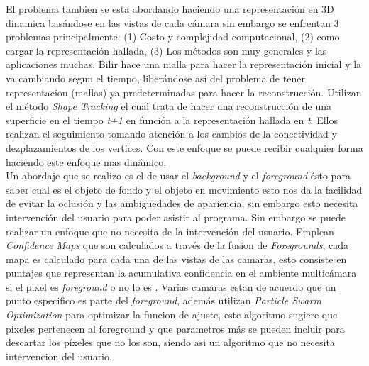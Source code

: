 \documentclass[conference]{IEEEtran}
\begin{document}
El problema tambien se esta abordando haciendo una representaci\'on en 3D dinamica bas\'andose en las vistas de cada c\'amara sin embargo se enfrentan 3 problemas principalmente: (1) Costo y complejidad computacional, (2) como cargar la representaci\'on hallada, (3) Los m\'etodos son muy generales y las aplicaciones muchas. Bilir hace una malla para hacer la representaci\'on inicial y la va cambiando segun el tiempo, liber\'andose as\'i del problema de tener representacion (mallas) ya predeterminadas para hacer la reconstrucci\'on. Utilizan el m\'etodo \textit{Shape Tracking} el cual trata de hacer una reconstrucci\'on de una superficie en el tiempo \emph{t+1} en funci\'on a la representaci\'on hallada en \emph{t}. Ellos realizan el seguimiento tomando atenci\'on a los cambios de la conectividad y dezplazamientos   de los vertices. Con este enfoque se puede recibir cualquier forma haciendo este enfoque mas din\'amico.\cite{Bilir_art}\\
Un abordaje que se realizo es el de usar el \textit{background} y el \textit{foreground} \'esto para saber cual es el objeto de fondo y el objeto en movimiento esto nos da la facilidad de evitar la oclusi\'on y las ambiguedades de apariencia, sin embargo esto necesita intervenci\'on del usuario para poder asistir al programa. Sin embargo se puede realizar un enfoque que no necesita de la intervenci\'on del usuario. Emplean \textit{Confidence Maps} que son calculados a trav\'es de la fusion de \textit{Foregrounds}, cada mapa es calculado para cada una de las vistas de las camaras, esto consiste en puntajes que representan la acumulativa confidencia en el ambiente multic\'amara si el pixel es \textit{foreground} o no lo es . Varias camaras estan de acuerdo que un punto especifico es parte del \textit{foreground}, adem\'as utilizan \textit{Particle Swarm Optimization } para optimizar la funcion de ajuste, este algoritmo sugiere que pixeles pertenecen al foreground y que parametros m\'as se pueden incluir para descartar los p\'ixeles que no los son, siendo asi un algoritmo que no necesita intervencion del usuario\cite {Greek_art}.



%
%
\end{document}
